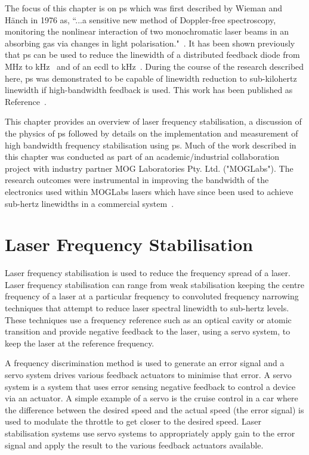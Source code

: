 The focus of this chapter is on \gls{ps} which was first described by Wieman and H\"anch in 1976 as, ``...a sensitive new method of Doppler-free spectroscopy, monitoring the nonlinear interaction of two monochromatic laser beams in an absorbing gas via changes in light polarisation."~\cite{wieman_doppler-free_1976,demtroder_laser_2003}.
It has been shown previously that \gls{ps} can be used to reduce the linewidth of a distributed feedback diode from \unit[2]{MHz} to \unit[20]{kHz}~\cite{torii_laser-phase_2012} and of an \gls{ecdl} to \unit[65]{kHz}~\cite{yoshikawa_frequency_2003}.
During the course of the research described here, \gls{ps} was demonstrated to be capable of linewidth reduction to sub-kilohertz linewidth if high-bandwidth feedback is used.
This work has been published as Reference~\cite{torrance_sub-kilohertz_2016}.

This chapter provides an overview of laser frequency stabilisation, a discussion of the physics of \gls{ps} followed by details on the implementation and measurement of high bandwidth frequency stabilisation using \gls{ps}.
Much of the work described in this chapter was conducted as part of an academic/industrial collaboration project with industry partner MOG Laboratories Pty. Ltd. ("MOGLabs").
The research outcomes were instrumental in improving the bandwidth of the electronics used within MOGLabs lasers which have since been used to achieve sub-hertz linewidths in a commercial system~\cite{menlo_systems_ors-dl_2016}.

\section{Laser Frequency Stabilisation}

Laser frequency stabilisation is used to reduce the frequency spread of a laser.
Laser frequency stabilisation can range from weak stabilisation keeping the centre frequency of a laser at a particular frequency to convoluted frequency narrowing techniques that attempt to reduce laser spectral linewidth to sub-hertz levels.
These techniques use a frequency reference such as an optical cavity or atomic transition and provide negative feedback to the laser, using a servo system, to keep the laser at the reference frequency.

A frequency discrimination method is used to generate an error signal and a servo system drives various feedback actuators to minimise that error.
A servo system is a system that uses error sensing negative feedback to control a device via an actuator.
A simple example of a servo is the cruise control in a car where the difference between the desired speed and the actual speed (the error signal) is used to modulate the throttle to get closer to the desired speed.
Laser stabilisation systems use servo systems to appropriately apply gain to the error signal and apply the result to the various feedback actuators available.

